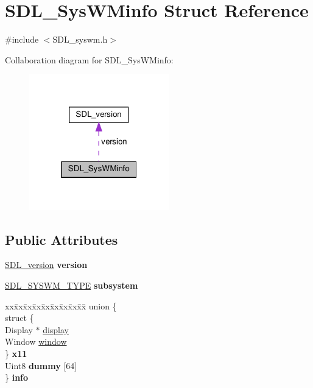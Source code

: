 \hypertarget{structSDL__SysWMinfo}{}\section{S\+D\+L\+\_\+\+Sys\+W\+Minfo Struct Reference}
\label{structSDL__SysWMinfo}


{\ttfamily \#include $<$S\+D\+L\+\_\+syswm.\+h$>$}



Collaboration diagram for S\+D\+L\+\_\+\+Sys\+W\+Minfo\+:\nopagebreak
\begin{figure}[H]
\begin{center}
\leavevmode
\includegraphics[width=172pt]{structSDL__SysWMinfo__coll__graph}
\end{center}
\end{figure}
\subsection*{Public Attributes}
\begin{DoxyCompactItemize}
\item 
\mbox{\label{structSDL__SysWMinfo_ac3a70af022d4849e9ff546595e94627f}} 
\hyperlink{structSDL__version}{S\+D\+L\+\_\+version} {\bfseries version}
\item 
\mbox{\label{structSDL__SysWMinfo_a438b6a06ab3ee417293c7b7fc5a23855}} 
\hyperlink{SDL__syswm_8h_a064c26598287280fff2a00d6758ac4f7}{S\+D\+L\+\_\+\+S\+Y\+S\+W\+M\+\_\+\+T\+Y\+PE} {\bfseries subsystem}
\item 
\mbox{\label{structSDL__SysWMinfo_a96639a5304141225509483baf5910439}} 
\begin{tabbing}
xx\=xx\=xx\=xx\=xx\=xx\=xx\=xx\=xx\=\kill
union \{\\
\>struct \{\\
\>\>Display $\ast$ \hyperlink{structSDL__SysWMinfo_a58ef8bc8e1065e95e75a08d08f4a4741}{display}\\
\>\>Window \hyperlink{structSDL__SysWMinfo_a83ca4b0f4bdf67a0edee03d5bde86b93}{window}\\
\>\} {\bfseries x11}\\
\>Uint8 {\bfseries dummy} \mbox{[}64\mbox{]}\\
\} {\bfseries info}\\

\end{tabbing}\end{DoxyCompactItemize}


